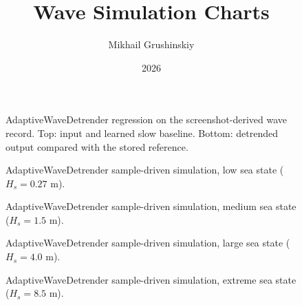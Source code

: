 \documentclass[11pt,letterpaper]{article}
\title{Wave Simulation Charts}
\author{Mikhail Grushinskiy}
\date{2026}
\begin{document}
    \maketitle



    \begin{figure}[H]\centering
    \resizebox{\textwidth}{!}{}
    \caption{AdaptiveWaveDetrender regression on the screenshot-derived wave record. Top: input and learned slow baseline. Bottom: detrended output compared with the stored reference.}
    \label{fig:adaptive_wave_detrender_regression}
    \end{figure}


\begin{figure}[H]\centering
\resizebox{\textwidth}{!}{}
\caption{AdaptiveWaveDetrender sample-driven simulation, low sea state ($H_s=0.27$ m).}
\label{fig:adaptive_wave_detrender_sim_h0270}
\end{figure}

\begin{figure}[H]\centering
\resizebox{\textwidth}{!}{}
\caption{AdaptiveWaveDetrender sample-driven simulation, medium sea state ($H_s=1.5$ m).}
\label{fig:adaptive_wave_detrender_sim_h1500}
\end{figure}

\begin{figure}[H]\centering
\resizebox{\textwidth}{!}{}
\caption{AdaptiveWaveDetrender sample-driven simulation, large sea state ($H_s=4.0$ m).}
\label{fig:adaptive_wave_detrender_sim_h4000}
\end{figure}

\begin{figure}[H]\centering
\resizebox{\textwidth}{!}{}
\caption{AdaptiveWaveDetrender sample-driven simulation, extreme sea state ($H_s=8.5$ m).}
\label{fig:adaptive_wave_detrender_sim_h8500}
\end{figure}
\end{document}

